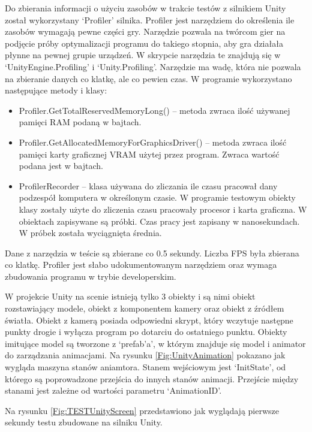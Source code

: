 \documentclass[12pt,twoside]{article}
\begin{document}
Do zbierania informacji o użyciu zasobów w trakcie testów z silnikiem Unity
został wykorzystany ‘Profiler’ silnika. Profiler jest narzędziem do określenia
ile zasobów wymagają pewne części gry. Narzędzie pozwala na twórcom gier na
podjęcie próby optymalizacji programu do takiego stopnia, aby gra działała
płynne na pewnej grupie urządzeń. W skrypcie narzędzia te znajdują się w
‘UnityEngine.Profiling’ i ‘Unity.Profiling’. Narzędzie ma wadę, która nie
pozwala na zbieranie danych co klatkę, ale co pewien czas. W programie
wykorzystano następujące metody i klasy:
\begin{itemize}
\item Profiler.GetTotalReservedMemoryLong() – metoda zwraca ilość używanej
pamięci RAM podaną w bajtach. 
\item Profiler.GetAllocatedMemoryForGraphicsDriver() – metoda zwraca ilość
pamięci karty graficznej VRAM użytej przez program. Zwraca wartość podana jest w
bajtach. 
\item ProfilerRecorder – klasa używana do zliczania ile czasu pracował dany
podzespół komputera w określonym czasie. W programie testowym obiekty klasy
zostały użyte do zliczenia czasu pracowały procesor i karta graficzna. W
obiektach zapisywane są próbki. Czas pracy jest zapisany w nanosekundach. W
próbek została wyciągnięta średnia.
\end{itemize}
Dane z narzędzia w teście są zbierane co 0.5 sekundy. Liczba FPS była zbierana
co klatkę. Profiler jest słabo udokumentowanym narzędziem oraz wymaga zbudowania
programu w trybie developerskim.

W projekcie Unity na scenie istnieją tylko 3 obiekty i są nimi obiekt
rozstawiający modele, obiekt z komponentem kamery oraz obiekt z źródłem światła.
Obiekt z kamerą posiada odpowiedni skrypt, który wczytuje następne punkty drogie
i wyłącza program po dotarciu do ostatniego punktu. Obiekty imitujące model są
tworzone z ‘prefab’a’, w którym znajduje się model i animator do zarządzania
animacjami. Na rysunku \ref{Fig:UnityAnimation} pokazano jak wygląda maszyna
stanów aniamtora. Stanem wejściowym jest ‘InitState’, od którego są poprowadzone
przejścia do innych stanów animacji. Przejście między stanami jest zależne od
wartości parametru ‘AnimationID’. 



Na rysunku \ref{Fig:TESTUnityScreen} przedstawiono jak wyglądają pierwsze sekundy testu zbudowane na silniku Unity. 
\end{document}
